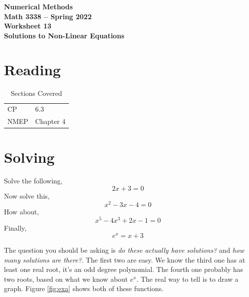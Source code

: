 \documentclass[11pt,letterpaper]{article}
\newcommand{\semester}{Spring 2022}
\begin{document}
\begin{center}
{\huge{\bf  Numerical Methods}} \\[1.5ex]
{\bf Math 3338 -- \semester}\\[1.5ex]
{\Large{\bf Worksheet 13\ \\[2ex] Solutions to Non-Linear Equations}}\\
\end{center}
\vspace{2mm}


\section{Reading}

\begin{table}[!ht]
 \centering
 \begin{tabular}{ll}
   CP &  6.3 \\
 NMEP &  Chapter 4
 \end{tabular}
\caption{Sections Covered}
\end{table}

\section{Solving}

Solve the following,
\[
2x+3 = 0
\]
Now solve this,
\[
x^2-3x-4 = 0
\]
How about,
\[
x^5-4x^3+2x-1 = 0
\]
Finally,
\[
e^x = x+3
\]

The question you should be asking is \emph{do these actually have solutions?} and \emph{how many 
solutions are there?}. The first two are easy. We know the third
one has at least one real root, it's an odd degree polynomial. The fourth one probably has two
roots, based on what we know about $e^x$. The real way to tell is to draw a graph. Figure \ref{fig:exa}
shows both of these functions.
\end{document}
